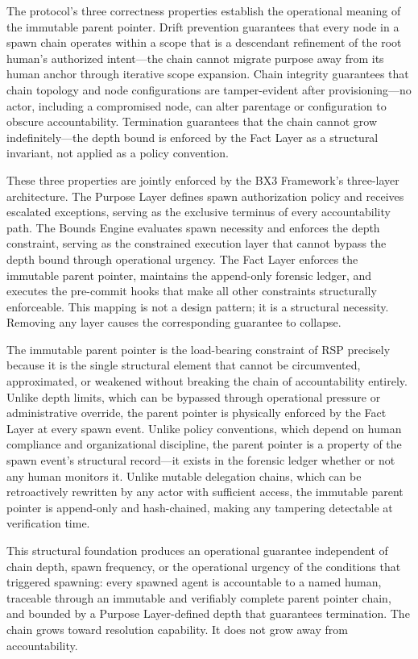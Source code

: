 The protocol's three correctness properties establish the operational meaning of the immutable parent pointer. Drift prevention guarantees that every node in a spawn chain operates within a scope that is a descendant refinement of the root human's authorized intent---the chain cannot migrate purpose away from its human anchor through iterative scope expansion. Chain integrity guarantees that chain topology and node configurations are tamper-evident after provisioning---no actor, including a compromised node, can alter parentage or configuration to obscure accountability. Termination guarantees that the chain cannot grow indefinitely---the depth bound is enforced by the Fact Layer as a structural invariant, not applied as a policy convention.

These three properties are jointly enforced by the BX3 Framework's three-layer architecture. The Purpose Layer defines spawn authorization policy and receives escalated exceptions, serving as the exclusive terminus of every accountability path. The Bounds Engine evaluates spawn necessity and enforces the depth constraint, serving as the constrained execution layer that cannot bypass the depth bound through operational urgency. The Fact Layer enforces the immutable parent pointer, maintains the append-only forensic ledger, and executes the pre-commit hooks that make all other constraints structurally enforceable. This mapping is not a design pattern; it is a structural necessity. Removing any layer causes the corresponding guarantee to collapse.

The immutable parent pointer is the load-bearing constraint of RSP precisely because it is the single structural element that cannot be circumvented, approximated, or weakened without breaking the chain of accountability entirely. Unlike depth limits, which can be bypassed through operational pressure or administrative override, the parent pointer is physically enforced by the Fact Layer at every spawn event. Unlike policy conventions, which depend on human compliance and organizational discipline, the parent pointer is a property of the spawn event's structural record---it exists in the forensic ledger whether or not any human monitors it. Unlike mutable delegation chains, which can be retroactively rewritten by any actor with sufficient access, the immutable parent pointer is append-only and hash-chained, making any tampering detectable at verification time.

This structural foundation produces an operational guarantee independent of chain depth, spawn frequency, or the operational urgency of the conditions that triggered spawning: every spawned agent is accountable to a named human, traceable through an immutable and verifiably complete parent pointer chain, and bounded by a Purpose Layer-defined depth that guarantees termination. The chain grows toward resolution capability. It does not grow away from accountability.

